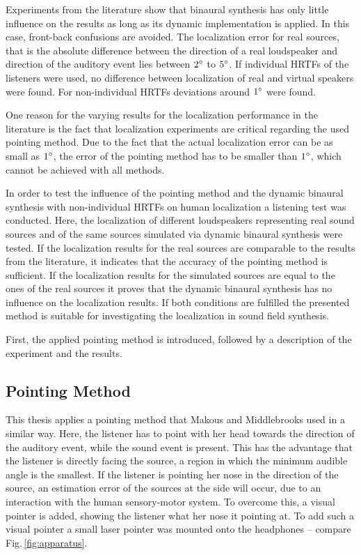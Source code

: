 Experiments from the literature show that binaural synthesis has only
little influence on the results as long as its dynamic implementation is applied. In
this case, front-back confusions are avoided.
The localization error for real sources,
that is the absolute difference between the direction of a real
loudspeaker and direction of the auditory event lies between
$2^\circ$ to $5^\circ$.\autocite{Seeber2003a,Bronkhorst1995,Hess2004,Makous1990}
If individual \acp{HRTF} of the listeners were used, no difference between
localization of real and virtual speakers were found.
For non-individual \acp{HRTF} deviations
around $1^\circ$ were found.\autocite{Seeber2003a}

One reason for the varying results for the localization performance in the
literature is the fact that localization experiments are critical
regarding the used pointing method. Due to the fact that the actual localization error
can be as small
as $1^\circ$, the error of the pointing method has to be smaller than $1^\circ$, which
cannot be achieved with all methods.\autocite{Majdak2008,Seeber2003a}

In order to test the influence of the pointing method and the dynamic binaural
synthesis with non-individual \acp{HRTF} on human localization a listening test
was conducted. Here, the localization of different loudspeakers
representing real sound sources and of the same sources simulated via dynamic
binaural synthesis were tested. If the localization results for the real sources
are comparable to the results from the literature, it indicates that the
accuracy of the pointing method is sufficient. If the localization results for
the simulated sources are equal to the ones of the real sources it proves that
the dynamic binaural synthesis has no influence on the localization results. If
both conditions are fulfilled the presented method is suitable for investigating the
localization in sound field synthesis.

First, the applied pointing method is introduced, followed by a description of
the experiment and the results.

\subsection{Pointing Method}
\label{sec:pointing_method}

This thesis applies a pointing method that  Makous and
Middlebrooks\autocite{Makous1990} used in a similar way.
Here, the listener has to point with her head towards
the direction of the auditory event,
while the sound event is present.
This has the advantage that the listener is directly facing the source, a region
in which the minimum audible angle is the smallest.\autocite{Mills1958}
If the listener is pointing her nose in the direction of the source, an
estimation error of the sources at the side will occur, due to an interaction
with the human sensory-motor system. To overcome this, a visual pointer is
added, showing the
listener what her nose it pointing at.\autocite{Lewald2000}
To add such a visual pointer a small laser pointer was mounted onto the
headphones -- compare Fig.\,\ref{fig:apparatus}.

